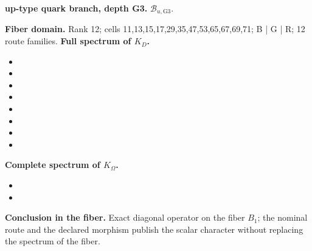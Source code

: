 \medskip
{}
\noindent\textbf{up-type quark branch, depth G3.} \(\mathcal B_{u,\mathrm{G3}}\).\par
\noindent\textbf{Fiber domain.} Rank 12; cells 11,13,15,17,29,35,47,53,65,67,69,71; B | G | R; 12 route families.
\noindent\textbf{Full spectrum of \(K_D\).}
\begin{itemize}
\item \texttt{}
\item \texttt{}
\item \texttt{}
\item \texttt{}
\item \texttt{}
\item \texttt{}
\item \texttt{}
\item \texttt{}
\end{itemize}
\noindent\textbf{Complete spectrum of \(K_\Omega\).}
\begin{itemize}
\item \texttt{}
\item \texttt{}
\end{itemize}
\noindent\textbf{Conclusion in the fiber.} Exact diagonal operator on the fiber \(B_1\); the nominal route and the declared morphism publish the scalar character without replacing the spectrum of the fiber.
\medskip
\endgroup
